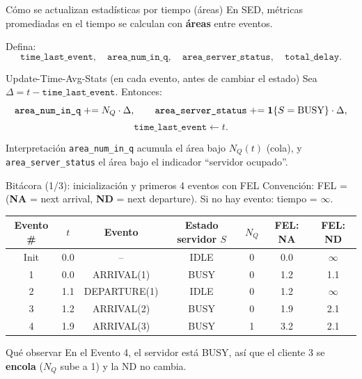 \documentclass[aspectratio=1610, 9pt]{beamer}
\begin{document}
\begin{frame}{ Cómo se actualizan estadísticas por tiempo (áreas)}
\small
En SED, métricas promediadas en el tiempo se calculan con \textbf{áreas} entre eventos.

\vspace{4pt}
Defina:
\[
\texttt{time\_last\_event},\quad
\texttt{area\_num\_in\_q},\quad
\texttt{area\_server\_status},\quad
\texttt{total\_delay}.
\]

\begin{block}{Update-Time-Avg-Stats (en cada evento, antes de cambiar el estado)}
Sea $\Delta = t-\texttt{time\_last\_event}$. Entonces:
\[
\texttt{area\_num\_in\_q}\;{+}{=}\; N_Q \cdot \Delta,\qquad
\texttt{area\_server\_status}\;{+}{=}\; \mathbf{1}\{S=\text{BUSY}\}\cdot \Delta,
\]
\[
\texttt{time\_last\_event}\leftarrow t.
\]
\end{block}

\begin{block}{Interpretación}
\texttt{area\_num\_in\_q} acumula el área bajo $N_Q(t)$ (cola), y
\texttt{area\_server\_status} el área bajo el indicador “servidor ocupado”.
\end{block}
\end{frame}

\begin{frame}{Bitácora (1/3): inicialización y primeros 4 eventos con FEL}
\small
Convención: FEL = (\textbf{NA} = next arrival, \textbf{ND} = next departure).  
Si no hay evento: tiempo = $\infty$.

\vspace{2pt}
\setlength{\tabcolsep}{4pt}
\renewcommand{\arraystretch}{1.15}
\begin{table}
\centering
\scriptsize
\begin{tabular}{@{}c c c c c c c@{}}
\toprule
Evento \# & $t$ & Evento & Estado servidor $S$ & $N_Q$ & FEL: NA & FEL: ND\\
\midrule
Init & 0.0 & -- & IDLE & 0 & 0.0 & $\infty$\\
1 & 0.0 & ARRIVAL(1) & BUSY & 0 & 1.2 & 1.1\\
2 & 1.1 & DEPARTURE(1) & IDLE & 0 & 1.2 & $\infty$\\
3 & 1.2 & ARRIVAL(2) & BUSY & 0 & 1.9 & 2.1\\
4 & 1.9 & ARRIVAL(3) & BUSY & 1 & 3.2 & 2.1\\
\bottomrule
\end{tabular}
\end{table}

\vspace{4pt}
\begin{block}{Qué observar}
En el Evento 4, el servidor está BUSY, así que el cliente 3 se \textbf{encola} ($N_Q$ sube a 1) y la ND no cambia.
\end{block}
\end{frame}
\end{document}
